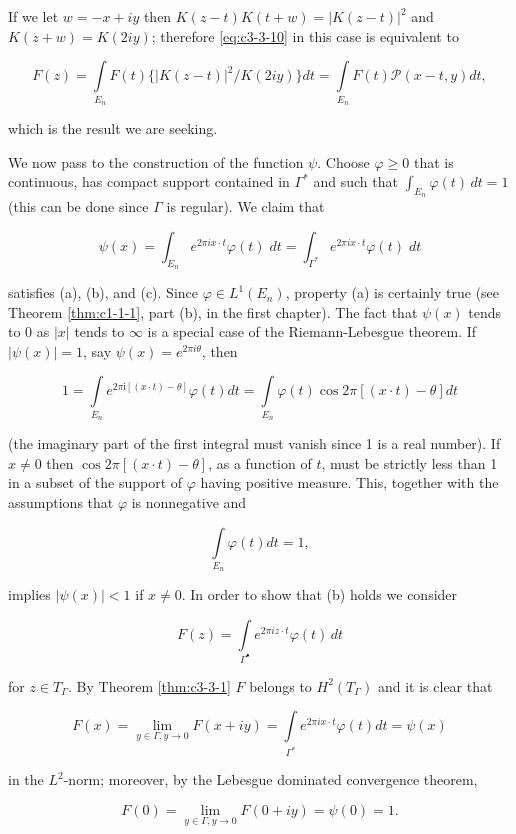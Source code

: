 If we let $w = -x + iy$ then $K(z-t)K(t+w) = |K(z-t)|^{2}$ and $K(z+w) = K(2iy)$; therefore \eqref{eq:c3-3-10} in this case is equivalent to

\[
F(z)=\int\limits_{E_{n}}F(t)\{|K(z-t)|^{2}/K(2i y)\}d t=\int\limits_{E_{n}}F(t)\mathcal{P}(x-t,y)d t,
\]

which is the result we are seeking.

We now pass to the construction of the function $\psi$. Choose $\varphi \geq 0$ that is continuous, has compact support contained in $\Gamma^*$ and such that $\int_{E_n} \varphi(t) \, dt = 1$ (this can be done since $\Gamma$ is regular). We claim that

\[
\psi(x)=\int_{E_{n}}e^{2\pi i x\cdot t}\varphi(t)\;d t=\int_{\Gamma^{*}}e^{2\pi i x\cdot t}\varphi(t)\;d t
\]

satisfies (a), (b), and (c). Since $\varphi \in L^{1}(E_{n})$, property (a) is certainly true (see Theorem \ref{thm:c1-1-1}, part (b), in the first chapter). The fact that $\psi(x)$ tends to 0 as $|x|$ tends to $\infty$ is a special case of the Riemann-Lebesgue theorem. If $|\psi(x)| = 1$, say $\psi(x) = e^{2\pi i\theta}$, then

\[
1=\int\limits_{E_{n}}e^{2\pi\mathrm{i}\left[(x\cdot t)-\theta\right]}\varphi(t)dt=\int\limits_{E_{n}}\varphi(t)\cos2\pi\left[(x\cdot t)-\theta\right]dt
\]

(the imaginary part of the first integral must vanish since 1 is a real number). If $x \neq 0$ then $\cos 2\pi[(x \cdot t) - \theta]$, as a function of $t$, must be strictly less than 1 in a subset of the support of $\varphi$ having positive measure. This, together with the assumptions that $\varphi$ is nonnegative and

\[
\int\limits_{E_{n}}\varphi(t)dt=1,
\]

implies $\left|\psi(x)\right| < 1$ if $x \neq 0$. In order to show that (b) holds we consider

\[
F(z)=\int\limits_{\Gamma^{\bullet}}e^{2\pi i z\cdot t}\varphi(t)\,dt
\]

for $z \in T_{\Gamma}$. By Theorem \ref{thm:c3-3-1} $F$ belongs to $H^2(T_{\Gamma})$ and it is clear that

\[
F(x)=\lim_{y\in\Gamma,y\to0}F(x+iy)=\int\limits_{\Gamma^{*}}e^{2\pi i x\cdot t}\varphi(t)dt=\psi(x)
\]

in the $L^{2}$-norm; moreover, by the Lebesgue dominated convergence theorem,

\begin{equation}\label{eq:c3-3-11}
F(0)=\lim_{y\in\Gamma,y\to0}F(0+iy)=\psi(0)=1.
\end{equation}

